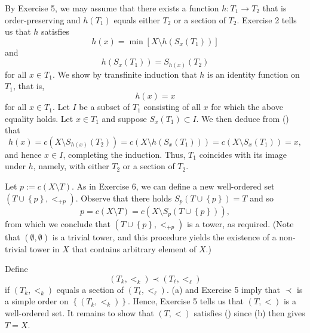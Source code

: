 \documentclass[a4paper,12pt]{article}
\begin{document}
\begin{sol}\leavevmode \par
	By Exercise 5,
	we may assume that there exists a function \( h:T_1 \to T_2 \)
	that is order-preserving and \( h(T_1) \) equals
	either \( T_2 \) or a section of \( T_2 \).
	Exercise 2 tells us that \( h \) satisfies
	\begin{equation*}
		h(x) = \min{\left[ X \setminus h(S_x(T_1)) \right]}
	\end{equation*}
	and
	\begin{equation}\label{eq:secsuppE7}
		h \left( S_{x}(T_1) \right) = S_{h(x)}(T_2) 
	\end{equation}
	for all \(  x \in T_1 \).
	We show by transfinite induction that \( h \) is an identity function on \( T_1 \),
	that is,
	\begin{equation*}
		h(x) = x
	\end{equation*}
	for all \(  x \in T_1 \).
	Let \( I \) be a subset of \( T_1 \) consisting of all \( x \) for which
	the above equality holds.
	Let \(  x \in T_1 \) and suppose \( S_x(T_1) \subset I\).
	We then deduce from () that
	\begin{equation*}
		h(x)
		=
		c(X \setminus S_{h(x)}(T_2))
		=
		c(X \setminus h(S_{x}(T_1)))
		=
		c(X \setminus S_{x}(T_1))
		=x,
	\end{equation*}
	and hence \(  x \in I \),
	completing the induction.
	Thus, \( T_1 \) coincides with its image under \( h \),
	namely, with either \( T_2 \) or a section of \( T_2 \).
	
	Let \( p:=c(X \setminus T) \).
	As in Exercise 6,
	we can define a new well-ordered set
	\( (T \cup \left\{ p \right\},<_{+p}) \).
	Observe that there holds \( S_p(T \cup \left\{ p \right\})=T \)
	and so
	\begin{equation*}
		p = c(X \setminus T) = c(X \setminus S_p(T \cup \left\{ p \right\})),
	\end{equation*}
	from which we conclude that
	\( (T \cup \left\{ p \right\},<_{+p}) \)
	is a tower, as required.
	(Note that \( (\emptyset, \emptyset) \) is a trivial tower,
	and this procedure yields the existence of a non-trivial tower in \( X \)
	that contains arbitrary element of \( X \).)
	
	Define
	\begin{equation*}
		(T_k,<_k) \prec (T_{\ell}, <_{\ell})
	\end{equation*}
	if \( (T_k,<_k) \) equals a section of \( (T_{\ell}, <_{\ell}) \).
	(a) and Exercise 5 imply that \( \prec \) is a simple order on
	\( \left\{ (T_k,<_k) \right\} \).
	Hence, Exercise 5 tells us that \( (T,<) \) is a well-ordered set.
	It remains to show that \( (T,<) \) satisfies ()
	since (b) then gives \( T=X \).
	

\end{sol}
\end{document}
